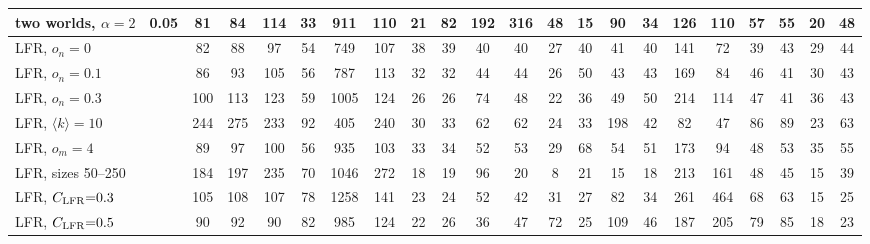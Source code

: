 \begin{table}[p]
{\begin{tabular}{llcccc|cc|cccccc|cccccccc}
two worlds, $\alpha{=}2$ & 0.05 & 81 & 84 & 114 & 33 & 911 & 110 & 21 & 82 & 192 & 316 & 48 & 15 & 90 & 34 & 126 & 110 & 57 & 55 & 20 & 48 \\
\hline
LFR, $o_n{=}0$ &  & 82 & 88 & 97 & 54 & 749 & 107 & 38 & 39 & 40 & 40 & 27 & 40 & 41 & 40 & 141 & 72 & 39 & 43 & 29 & 44 \\
LFR, $o_n{=}0.1$ &  & 86 & 93 & 105 & 56 & 787 & 113 & 32 & 32 & 44 & 44 & 26 & 50 & 43 & 43 & 169 & 84 & 46 & 41 & 30 & 43 \\
LFR, $o_n{=}0.3$ &  & 100 & 113 & 123 & 59 & 1005 & 124 & 26 & 26 & 74 & 48 & 22 & 36 & 49 & 50 & 214 & 114 & 47 & 41 & 36 & 43 \\
LFR, $\langle k\rangle{=}10$ &  & 244 & 275 & 233 & 92 & 405 & 240 & 30 & 33 & 62 & 62 & 24 & 33 & 198 & 42 & 82 & 47 & 86 & 89 & 23 & 63 \\
LFR, $o_m{=}4$ &  & 89 & 97 & 100 & 56 & 935 & 103 & 33 & 34 & 52 & 53 & 29 & 68 & 54 & 51 & 173 & 94 & 48 & 53 & 35 & 55 \\
LFR, sizes 50--250 &  & 184 & 197 & 235 & 70 & 1046 & 272 & 18 & 19 & 96 & 20 & 8 & 21 & 15 & 18 & 213 & 161 & 48 & 45 & 15 & 39 \\
LFR, $C_{\rm LFR}{=}0.3$ &  & 105 & 108 & 107 & 78 & 1258 & 141 & 23 & 24 & 52 & 42 & 31 & 27 & 82 & 34 & 261 & 464 & 68 & 63 & 15 & 25 \\
LFR, $C_{\rm LFR}{=}0.5$ &  & 90 & 92 & 90 & 82 & 985 & 124 & 22 & 26 & 36 & 47 & 72 & 25 & 109 & 46 & 187 & 205 & 79 & 85 & 18 & 23 \\
\hline\hline
\end{tabular}}
\end{table}

